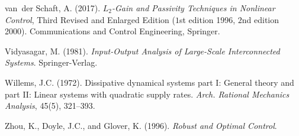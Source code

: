 \documentclass[11pt]{article}
\begin{document}
\begin{thebibliography}{99.}
van~der Schaft, A. (2017).
\newblock \emph{$L_2$-Gain and Passivity Techniques in Nonlinear Control}, Third Revised and Enlarged Edition ($1$st edition 1996, $2$nd edition 2000).
\newblock Communications and Control Engineering, Springer.

Vidyasagar, M. (1981).
\newblock \emph{Input-Output Analysis of Large-Scale Interconnected Systems}.
\newblock Springer-Verlag.

Willems, J.C. (1972).
\newblock Dissipative dynamical systems part {I}: General theory and part {II}:
  Linear systems with quadratic supply rates.
\newblock \emph{Arch. Rational Mechanics Analysis}, 45(5), 321--393.

Zhou, K., Doyle, J.C., and Glover, K. (1996).
\newblock \emph{Robust and Optimal Control}.

\end{thebibliography}
\end{document}
